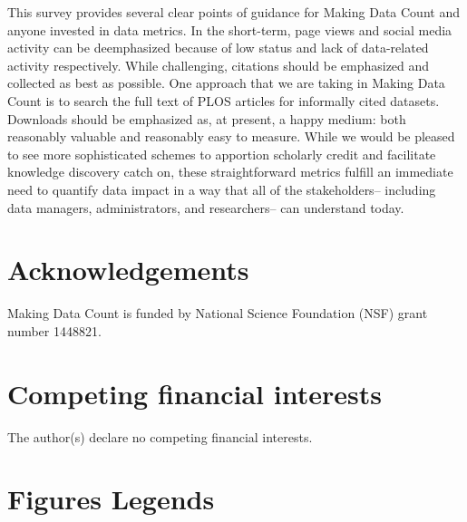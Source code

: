 \documentclass[english]{article}
\begin{document}
This survey provides several clear points of guidance for Making Data Count and anyone invested in data metrics.
In the short-term, page views and social media activity can be deemphasized because of low status and lack of data-related activity respectively.
While challenging, citations should be emphasized and collected as best as possible.
One approach that we are taking in Making Data Count is to search the full text of PLOS articles for informally cited datasets.
Downloads should be emphasized as, at present, a happy medium: both reasonably valuable and reasonably easy to measure.
While we would be pleased to see more sophisticated schemes to apportion scholarly credit and facilitate knowledge discovery \cite{ingwersen_indicators_2011, ding_enititymetrics_2013, katz_transitive_2014} catch on, these straightforward metrics fulfill an immediate need to quantify data impact in a way that all of the stakeholders-- including data managers, administrators, and researchers-- can understand today.


\section*{Acknowledgements}

Making Data Count is funded by National Science Foundation (NSF) grant number 1448821.


\section*{Competing financial interests}


The author(s) declare no competing financial interests.


\section*{Figures Legends}

\end{document}
